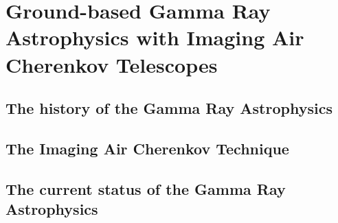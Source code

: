 
\chapter{Ground-based Gamma Ray Astrophysics with Imaging Air 
  Cherenkov Telescopes}
\label{chapter:iacts}

\section{The history of the Gamma Ray Astrophysics}

\section{The Imaging Air Cherenkov Technique}

\section{The current status of the Gamma Ray Astrophysics}

\endinput
%

